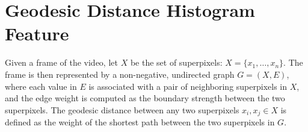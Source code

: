 \documentclass[runningheads]{llncs}
\begin{document}







\section{Geodesic Distance Histogram Feature}
\label{sec:ft}
Given a frame of the video, let $X$ be the set of superpixels: $X=\{x_1,\ldots,x_n \}$. 
The frame is then represented by a non-negative, undirected graph $G=(X,E)$, where each value in $E$ is associated with a pair of neighboring superpixels in $X$, and the edge weight is computed as the boundary strength between the two superpixels. %
The geodesic distance between any two superpixels $x_i,x_j \in X$  is defined as the weight of the shortest path between the two superpixels in $G$.
\end{document}
